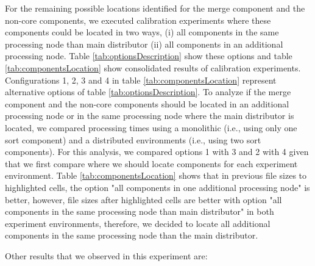 For the remaining possible locations identified for the merge component and the non-core components, we executed calibration experiments where these components could be located in two ways, (i) all components in the same processing node than main distributor (ii) all components in an additional processing node. Table \ref{tab:optionsDescription} show these options and table \ref{tab:componentsLocation} show consolidated results of calibration experiments. Configurations 1, 2, 3 and 4 in table \ref{tab:componentsLocation} represent alternative options  of table \ref{tab:optionsDescription}. To analyze if the merge component and the non-core components should be located in an additional processing node or in the same processing node where the main distributor is located, we compared processing times using a monolithic (i.e., using only one sort component) and a distributed environments (i.e., using two sort components). For this analysis, we compared options 1 with 3 and 2 with 4 given that we first compare where we should locate components for each experiment environment. Table \ref{tab:componentsLocation} shows that in previous file sizes to highlighted cells, the option "all components in one additional processing node" is better, however, file sizes after highlighted cells are better with option "all components in the same processing node than main distributor" in both experiment environments, therefore, we decided to locate all additional components in the same processing node than the main distributor.

Other results that we observed in this experiment are: 


